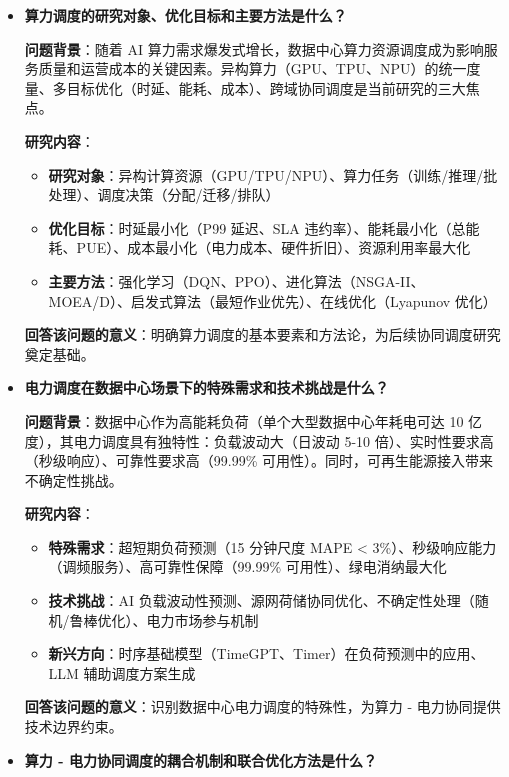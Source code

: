 \documentclass[12pt,a4paper]{article}
\begin{document}
\begin{itemize}
    \item[\textbf{RQ1}] \textbf{算力调度的研究对象、优化目标和主要方法是什么？}
    
    \textbf{问题背景}：随着 AI 算力需求爆发式增长，数据中心算力资源调度成为影响服务质量和运营成本的关键因素。异构算力（GPU、TPU、NPU）的统一度量、多目标优化（时延、能耗、成本）、跨域协同调度是当前研究的三大焦点。
    
    \textbf{研究内容}：
    \begin{itemize}
        \item \textbf{研究对象}：异构计算资源（GPU/TPU/NPU）、算力任务（训练/推理/批处理）、调度决策（分配/迁移/排队）
        \item \textbf{优化目标}：时延最小化（P99 延迟、SLA 违约率）、能耗最小化（总能耗、PUE）、成本最小化（电力成本、硬件折旧）、资源利用率最大化
        \item \textbf{主要方法}：强化学习（DQN、PPO）、进化算法（NSGA-II、MOEA/D）、启发式算法（最短作业优先）、在线优化（Lyapunov 优化）
    \end{itemize}
    
    \textbf{回答该问题的意义}：明确算力调度的基本要素和方法论，为后续协同调度研究奠定基础。
    
    \item[\textbf{RQ2}] \textbf{电力调度在数据中心场景下的特殊需求和技术挑战是什么？}
    
    \textbf{问题背景}：数据中心作为高能耗负荷（单个大型数据中心年耗电可达 10 亿度），其电力调度具有独特性：负载波动大（日波动 5-10 倍）、实时性要求高（秒级响应）、可靠性要求高（99.99\% 可用性）。同时，可再生能源接入带来不确定性挑战。
    
    \textbf{研究内容}：
    \begin{itemize}
        \item \textbf{特殊需求}：超短期负荷预测（15 分钟尺度 MAPE < 3\%）、秒级响应能力（调频服务）、高可靠性保障（99.99\% 可用性）、绿电消纳最大化
        \item \textbf{技术挑战}：AI 负载波动性预测、源网荷储协同优化、不确定性处理（随机/鲁棒优化）、电力市场参与机制
        \item \textbf{新兴方向}：时序基础模型（TimeGPT、Timer）在负荷预测中的应用、LLM 辅助调度方案生成
    \end{itemize}
    
    \textbf{回答该问题的意义}：识别数据中心电力调度的特殊性，为算力 - 电力协同提供技术边界约束。
    
    \item[\textbf{RQ3}] \textbf{算力 - 电力协同调度的耦合机制和联合优化方法是什么？}
    

\end{itemize}
\end{document}
